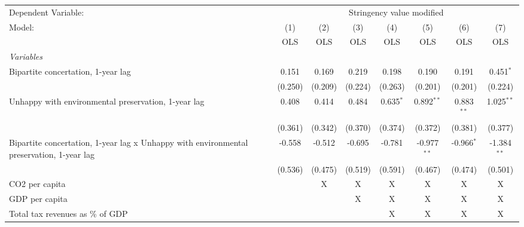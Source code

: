 
\begingroup
\centering
\begin{tabular}{lccccccc}
   \toprule
   Dependent Variable: & \multicolumn{7}{c}{Stringency value modified}\\
   Model:                                                                                   & (1)     & (2)     & (3)     & (4)         & (5)           & (6)          & (7)\\  
                                                                                            &  OLS    & OLS     & OLS     & OLS         & OLS           & OLS          & OLS\\  
   \midrule
   \emph{Variables}\\
   Bipartite concertation, 1-year lag                                                       & 0.151   & 0.169   & 0.219   & 0.198       & 0.190         & 0.191        & 0.451$^{*}$\\   
                                                                                            & (0.250) & (0.209) & (0.224) & (0.263)     & (0.201)       & (0.201)      & (0.224)\\   
   Unhappy with environmental preservation, 1-year lag                                      & 0.408   & 0.414   & 0.484   & 0.635$^{*}$ & 0.892$^{**}$  & 0.883$^{**}$ & 1.025$^{**}$\\   
                                                                                            & (0.361) & (0.342) & (0.370) & (0.374)     & (0.372)       & (0.381)      & (0.377)\\   
   Bipartite concertation, 1-year lag x Unhappy with environmental preservation, 1-year lag & -0.558  & -0.512  & -0.695  & -0.781      & -0.977$^{**}$ & -0.966$^{*}$ & -1.384$^{**}$\\   
                                                                                            & (0.536) & (0.475) & (0.519) & (0.591)     & (0.467)       & (0.474)      & (0.501)\\   
   CO2 per capita                                                                           &         & X       & X       & X           & X             & X            & X\\  
   GDP per capita                                                                           &         &         & X       & X           & X             & X            & X\\  
   Total tax revenues as \% of GDP                                                          &         &         &         & X           & X             & X            & X\\  

\end{tabular}
